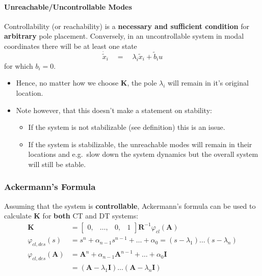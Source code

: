 \paragraph{Unreachable/Uncontrollable Modes}
Controllability (or reachability) is a \textbf{necessary and sufficient condition} for \textbf{arbitrary} pole placement.
Conversely, in an uncontrollable system in modal coordinates there will be at least one state
\begin{equation*}
    \dot{\tilde{x}}_i\quad=\quad\lambda_i\tilde{x}_i+\tilde{b}_i u
\end{equation*}
for which $b_i=0$.
\begin{itemize}
    \item Hence, no matter how we choose $\mathbf{K}$, the pole $\lambda_i$ will remain in it's original location.
    \item Note however, that this doesn't make a statement on stability:
          \begin{itemize}
              \item If the system is not stabilizable (see definition) this is an issue.
              \item If the system is stabilizable, the unreachable modes will remain in their locations and e.g.\ slow down the system dynamics but the overall system will still be stable.
          \end{itemize}
\end{itemize}

\subsubsection{Ackermann's Formula}
Assuming that the system is \textbf{controllable}, Ackermann's formula can be used to calculate $\mathbf{K}$ for \textbf{both} CT and DT systems:
\noindent\begin{align*}
    \mathbf{K}                   & =\begin{bmatrix}
                                        0, & \ldots, & 0, & 1
                                    \end{bmatrix}
    \mathbf{R}^{-1}\varphi_{cl}(\mathbf{A})                                                                   \\
    \varphi_{cl,des}(s)          & =s^n+\alpha_{n-1}s^{n-1}+\ldots+\alpha_0=(s-\lambda_1)\ldots(s-\lambda_n)  \\
    \varphi_{cl,des}(\mathbf{A}) & =\mathbf{A}^n+\alpha_{n-1}\mathbf{A}^{n-1}+\ldots+\alpha_0 \mathbf{I}      \\
                                 & = (\mathbf{A}-\lambda_1 \mathbf{I})\ldots(\mathbf{A}-\lambda_n \mathbf{I})
\end{align*}

